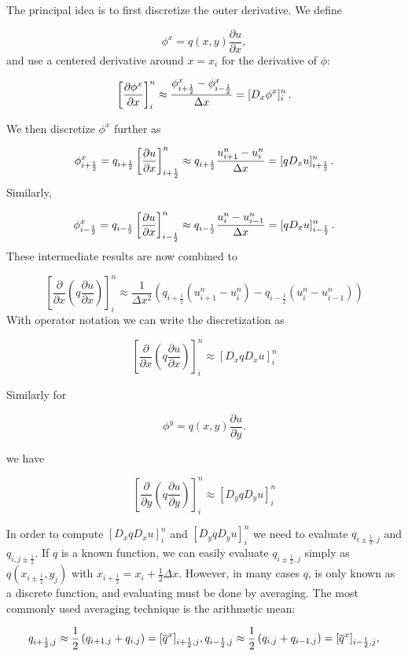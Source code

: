 \documentclass[letterpaper,10pt,english]{/usr/share/sphinx/texinputs/sphinxhowto}
\begin{document}
The principal idea is to first discretize the outer derivative. We
define

\[
\phi^x = q(x,y)
\frac{\partial u}{\partial x},
\] and use a centered derivative around $x=x_i$ for the derivative of
$\phi$:

\[
\left[\frac{\partial\phi^x}{\partial x}\right]^n_i
\approx \frac{\phi^x_{i+\frac{1}{2}} - \phi^x_{i-\frac{1}{2}}}{\Delta x}
= [D_x\phi^x]^n_i
\thinspace .
\]

We then discretize $\phi^x$ further as

\[
\phi^x_{i+\frac{1}{2}}  = q_{i+\frac{1}{2}}
\left[\frac{\partial u}{\partial x}\right]^n_{i+\frac{1}{2}}
\approx q_{i+\frac{1}{2}} \frac{u^n_{i+1} - u^n_{i}}{\Delta x}
= [q D_x u]_{i+\frac{1}{2}}^n
\thinspace .
\] Similarly,

\[
\phi^x_{i-\frac{1}{2}}  = q_{i-\frac{1}{2}}
\left[\frac{\partial u}{\partial x}\right]^n_{i-\frac{1}{2}}
\approx q_{i-\frac{1}{2}} \frac{u^n_{i} - u^n_{i-1}}{\Delta x}
= [q D_x u]_{i-\frac{1}{2}}^n
\thinspace .
\] These intermediate results are now combined to

\[
\left[
     \frac{\partial}{\partial x}\left( q
     \frac{\partial u}{\partial x}\right)\right]^n_i
     \approx \frac{1}{\Delta x^2}
     \left( q_{i+\frac{1}{2}} \left({u^n_{i+1} - u^n_{i}}\right)
     - q_{i-\frac{1}{2}} \left({u^n_{i} - u^n_{i-1}}\right)\right)
\] With operator notation we can write the discretization as

\[
\left[
     \frac{\partial}{\partial x}\left( q
     \frac{\partial u}{\partial x}\right)\right]^n_i
     \approx [D_xq D_x u]^n_i
\]

Similarly for

\[
\phi^y = q(x,y)
\frac{\partial u}{\partial y}.
\]

we have

\[
\left[
     \frac{\partial}{\partial y}\left( q
     \frac{\partial u}{\partial y}\right)\right]^n_i
     \approx [D_yq D_y u]^n_i
\]

In order to compute $[D_xq D_x u]^n_i$ and $[D_yq D_y u]^n_i$ we need to
evaluate $q_{i\pm\frac{1}{2},j}$ and $q_{i,j\pm\frac{1}{2}}$. If $q$ is
a known function, we can easily evaluate $q_{i\pm\frac{1}{2},j}$ simply
as $q(x_{i\pm\frac{1}{2}},y_j)$ with
$x_{i+\frac{1}{2}} = x_i + \frac{1}{2}\Delta x$. However, in many cases
$q$, is only known as a discrete function, and evaluating must be done
by averaging. The most commonly used averaging technique is the
arithmetic mean:

\[
q_{i+\frac{1}{2},j} \approx
     \frac{1}{2}\left(q_{i+1,j}+ q_{i,j}\right) =
     [\overline{q}^{x}]_{i+\frac{1}{2},j},\\
q_{i-\frac{1}{2},j} \approx
     \frac{1}{2}\left(q_{i,j}+ q_{i-1,j}\right) =
     [\overline{q}^{x}]_{i-\frac{1}{2},j},  
\]
\end{document}
